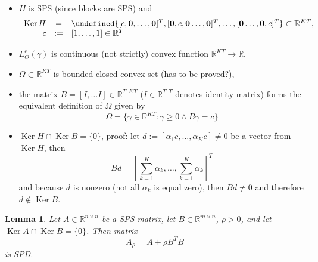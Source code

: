 \documentclass{article}
\newtheorem{lemma}{Lemma}
\DeclareMathOperator{\Ker}{Ker}
\let\span\undefined
\DeclareMathOperator{\span}{span}
\begin{document}
\begin{itemize}
\item $H$ is SPS (since blocks are SPS) and
 \begin{equation}
  \label{eq:kerH}
  \begin{array}{rcl}  
   \Ker H & = & \span \lbrace [c, {\bf 0}, \dots, {\bf 0}]^T, [{\bf 0}, c, {\bf 0} \dots, {\bf 0}]^T, \dots, [{\bf 0} \dots, {\bf 0}, c]^T \rbrace \subset \mathbb{R}^{KT}, \\
   c & := & [ 1, \dots, 1] \in \mathbb{R}^T
  \end{array}
 \end{equation}
\item $L^{\epsilon}_{\Theta}(\gamma)$ is continuous (not strictly) convex function $\mathbb{R}^{KT} \rightarrow \mathbb{R}$,
\item $\Omega \subset \mathbb{R}^{KT}$ is bounded closed convex set {\color{red}(has to be proved?)},
\item the matrix $B = [I, \dots I] \in \mathbb{R}^{T,KT}$ ($I \in \mathbb{R}^{T,T}$ denotes identity matrix) forms the equivalent definition of $\Omega$ given by
 \begin{displaymath}
  \Omega = \lbrace \gamma \in \mathbb{R}^{KT}: \gamma \geq 0 \wedge B\gamma = c \rbrace
 \end{displaymath}
\item $\Ker H \cap \Ker B = \lbrace 0 \rbrace$, proof: let $d := [\alpha_1 c, \dots, \alpha_K c] \neq 0$ be a vector from $\Ker H$, then
\begin{displaymath}
 Bd = \left[\sum\limits_{k=1}^K \alpha_k, \dots, \sum\limits_{k=1}^K \alpha_k \right]^T
\end{displaymath}
and because $d$ is nonzero (not all $\alpha_k$ is equal zero), then $Bd \neq 0$ and therefore $d \notin \Ker B$.
\end{itemize}

\begin{lemma}
\label{th:penalized}
Let $A \in \mathbb{R}^{n \times n}$ be a SPS matrix, let $B \in \mathbb{R}^{m \times n}$, $\rho > 0$, and let $\Ker A \cap \Ker B = \lbrace 0 \rbrace$.
Then matrix
\begin{displaymath}
A_{\rho} = A + \rho B^T B
\end{displaymath}
is SPD.
\end{lemma}
\end{document}

